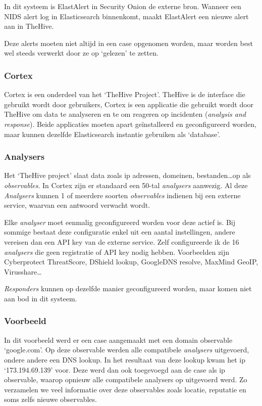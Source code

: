 \documentclass[a4paper, 12pt]{report}
\begin{document}
In dit systeem is ElastAlert in Security Onion de externe bron.
Wanneer een NIDS alert log in Elasticsearch binnenkomt, maakt ElastAlert een nieuwe alert aan in TheHive.

Deze alerts moeten niet altijd in een case opgenomen worden, maar worden best wel steeds verwerkt door ze op `gelezen' te zetten.

\subsubsection{Cortex}
\label{sec:cortex}
Cortex is een onderdeel van het `TheHive Project'.
TheHive is de interface die gebruikt wordt door gebruikers, Cortex is een applicatie die gebruikt wordt door TheHive om data te analyseren en te om reageren op incidenten (\emph{analysis and response}).
Beide applicaties moeten apart geïnstalleerd en geconfigureerd worden, maar kunnen dezelfde Elasticsearch instantie gebruiken als `database'.

\subsubsection{Analysers}
Het `TheHive project' slaat data zoals ip adressen, domeinen, bestanden\dots op als \emph{observables}.
In Cortex zijn er standaard een 50-tal \emph{analysers} aanwezig.
Al deze \emph{Analysers} kunnen 1 of meerdere soorten \emph{observables} indienen bij een externe service, waarvan een antwoord verwacht wordt.

Elke \emph{analyser} moet eenmalig geconfigureerd worden voor deze actief is.
Bij sommige bestaat deze configuratie enkel uit een aantal instellingen, andere vereisen dan een API key van de externe service.
Zelf configureerde ik de 16 \emph{analysers} die geen registratie of API key nodig hebben.
Voorbeelden zijn Cyberprotect ThreatScore, DShield lookup, GoogleDNS resolve, MaxMind GeoIP, Virusshare\dots

\emph{Responders} kunnen op dezelfde manier geconfigureerd worden, maar komen niet aan bod in dit systeem.

\subsubsection{Voorbeeld}
In dit voorbeeld werd er een case aangemaakt met een domain observable `google.com'.
Op deze observable werden alle compatibele \emph{analysers} uitgevoerd, ondere andere een DNS lookup.
In het resultaat van deze lookup kwam het ip `173.194.69.139' voor.
Deze werd dan ook toegevoegd aan de case als ip observable, waarop opnieuw alle compatibele analysers op uitgevoerd werd.
Zo verzamelen we veel informatie over deze observables zoals locatie, reputatie en soms zelfs nieuwe observables.
\end{document}
